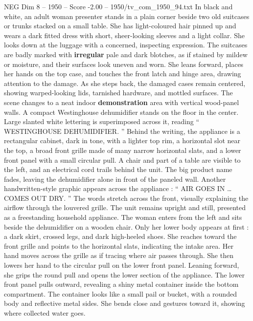 \begin{textsample}{NEG Dim 8 – 1950 – Score -2.00 – 1950/tv\_com\_1950\_94.txt}  \label{ex:f8_neg_026}
In black and white, an adult woman presenter stands in a plain corner beside two old suitcases or trunks stacked on a small table.
She has light-coloured hair pinned up and wears a dark fitted dress with short, sheer-looking sleeves and a light collar.
She looks down at the luggage with a concerned, inspecting expression.
The suitcases are badly marked with \textbf{irregular} pale and dark blotches, as if stained by mildew or moisture, and their surfaces look uneven and worn.
She leans forward, places her hands on the top case, and touches the front latch and hinge area, drawing attention to the damage.
As she steps back, the damaged cases remain centered, showing warped-looking lids, tarnished hardware, and mottled surfaces.
The scene changes to a neat indoor \textbf{demonstration} area with vertical wood-panel walls.
A compact Westinghouse dehumidifier stands on the floor in the center.
Large slanted white lettering is superimposed across it, reading “ WESTINGHOUSE DEHUMIDIFIER. ” Behind the writing, the appliance is a rectangular cabinet, dark in tone, with a lighter top rim, a horizontal slot near the top, a broad front grille made of many narrow horizontal slats, and a lower front panel with a small circular pull.
A chair and part of a table are visible to the left, and an electrical cord trails behind the unit.
The big product name fades, leaving the dehumidifier alone in front of the paneled wall.
Another handwritten-style graphic appears across the appliance : “ AIR GOES IN … COMES OUT DRY. ” The words stretch across the front, visually explaining the airflow through the louvered grille.
The unit remains upright and still, presented as a freestanding household appliance.
The woman enters from the left and sits beside the dehumidifier on a wooden chair.
Only her lower body appears at first : a dark skirt, crossed legs, and dark high-heeled shoes.
She reaches toward the front grille and points to the horizontal slats, indicating the intake area.
Her hand moves across the grille as if tracing where air passes through.
She then lowers her hand to the circular pull on the lower front panel.
Leaning forward, she grips the round pull and opens the lower section of the appliance.
The lower front panel pulls outward, revealing a shiny metal container inside the bottom compartment.
The container looks like a small pail or bucket, with a rounded body and reflective metal sides.
She bends close and gestures toward it, showing where collected water goes.

\end{textsample}
